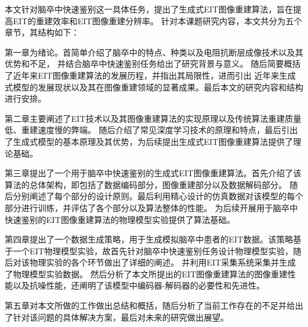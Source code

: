 
本文针对脑卒中快速鉴别这一具体任务，提出了生成式EIT图像重建算法，旨在提高EIT的重建效率和EIT图像重建分辨率。
针对本课题研究内容，本文共分为五个章节，其结构如下：

第一章为绪论。首简单介绍了脑卒中的特点、种类以及电阻抗断层成像技术以及其优势和不足，
并结合脑卒中快速鉴别任务给出了研究背景与意义。 随后简要概括了近年来EIT图像重建算法的发展历程，并指出其局限性，进而引出
近年来生成式模型的发展现状以及其在图像重建领域的显著成果。最后本文的研究内容和结构进行安排。

第二章主要阐述了EIT技术以及其图像重建算法的实现原理以及传统算法重建质量低、重建速度慢的弊端。
随后介绍了常见深度学习技术的原理和特点，最后引出了生成式模型的基本原理及其优势，为后续提出生成式EIT图像重建算法提供了理论基础。

第三章提出了一个用于脑卒中快速鉴别的生成式EIT图像重建算法。首先介绍了该算法的总体架构，即包括了数据编码部分，图像重建部分以及数据解码部分。
随后分别阐述了每个部分的设计原则。最后利用精心设计的仿真数据对该模型的每个部分进行训练，并评估了各个部分以及算法整体的性能。
为后续开展用于脑卒中快速鉴别的EIT图像重建算法的物理模型实验提供了算法基础。

第四章提出了一个数据生成策略，用于生成模拟脑卒中患者的EIT数据。该策略基于一个EIT物理模型实验，故首先针对脑卒中快速鉴别任务设计物理模型实验，随后对该物理实验的各个环节做出了详细的阐述。
并利用EIT采集系统采集并生成了物理模型实验数据。
然后分析了本文所提出的EIT图像重建算法的图像重建性能以及抗噪性能，还阐明了该模型中编码器-解码器的必要性和先进性。


第五章对本文所做的工作做出总结和概括，随后分析了当前工作存在的不足并给出了针对该问题的具体解决方案，最后对未来的研究做出展望。